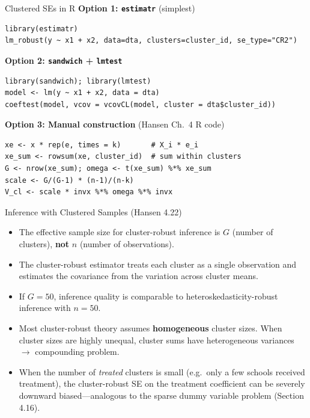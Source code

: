 \documentclass[aspectratio=169]{beamer}
\numberwithin{equation}{section}
\begin{document}
\begin{frame}[fragile]{Clustered SEs in R}
\textbf{Option 1: \texttt{estimatr}} (simplest)
\begin{lstlisting}
library(estimatr)
lm_robust(y ~ x1 + x2, data=dta, clusters=cluster_id, se_type="CR2")
\end{lstlisting}\pause
\vspace{-2pt}
\textbf{Option 2: \texttt{sandwich} + \texttt{lmtest}}
\begin{lstlisting}
library(sandwich); library(lmtest)
model <- lm(y ~ x1 + x2, data = dta)
coeftest(model, vcov = vcovCL(model, cluster = dta$cluster_id))
\end{lstlisting}\pause
\vspace{-2pt}
\textbf{Option 3: Manual construction} (Hansen Ch.\ 4 R code)
\begin{lstlisting}
xe <- x * rep(e, times = k)       # X_i * e_i
xe_sum <- rowsum(xe, cluster_id)  # sum within clusters
G <- nrow(xe_sum); omega <- t(xe_sum) %*% xe_sum
scale <- G/(G-1) * (n-1)/(n-k)
V_cl <- scale * invx %*% omega %*% invx
\end{lstlisting}
\end{frame}

\begin{frame}{Inference with Clustered Samples (Hansen 4.22)}
\begin{itemize}
\item The \alert{effective sample size} for cluster-robust inference is $G$ (number of clusters), \textbf{not} $n$ (number of observations). \pause
\item The cluster-robust estimator treats each cluster as a single observation and estimates the covariance from the variation across cluster means. \pause
\item If $G=50$, inference quality is comparable to heteroskedasticity-robust inference with $n=50$. \pause
\item Most cluster-robust theory assumes \textbf{homogeneous} cluster sizes.  When cluster sizes are highly unequal, cluster sums have heterogeneous variances $\rightarrow$ compounding problem. \pause
\item When the number of \emph{treated} clusters is small (e.g.\ only a few schools received treatment), the cluster-robust SE on the treatment coefficient can be severely downward biased---analogous to the sparse dummy variable problem (Section 4.16).
\end{itemize}
\end{frame}
\end{document}
